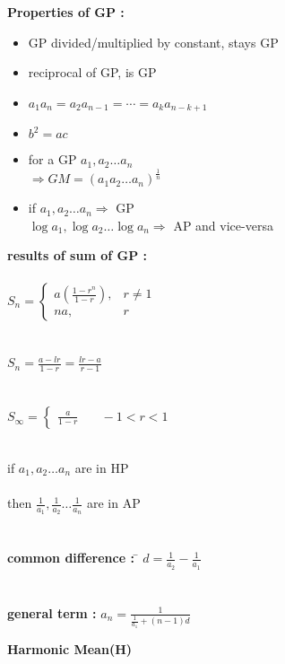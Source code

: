 \documentclass[11pt,a4paper,landscape]{article}
\begin{document}
\begin{multicols}{3}
{\bfseries \noindent Properties of GP :} 
\begin{itemize}
  	\item GP divided/multiplied by constant, stays GP
	\item reciprocal of GP, is GP
	\item $a_1 a_n = a_2 a_{n-1} =\cdots= a_k a_{n-k+1}$
	\item $b^2 = ac$
	\item for a GP $a_1, a_2 \ldots a_n$\\
		$\Rightarrow GM = \left({a_1 a_2 \ldots a_n} \right)^{\frac{1}{n}}$
	\item if  $a_1,a_2 \ldots a_n \Rightarrow$ GP \\
		$\log a_1, \log a_2 \ldots \log a_n \Rightarrow$ AP and vice-versa
\end{itemize}
{\bfseries \noindent results of sum of GP :} \\\\
$
	S_n =
	\begin{cases}
	a\left(\frac{1-r^{n}}{1-r} \right), & r \neq 1\\
	na, & r
	\end{cases}
$\\ \\ \\
$
	S_n = \frac{a -lr}{1-r}=  \displaystyle \frac{lr-a}{r-1}
$\\ \\ \\
$
	S_\infty =
	\begin{cases}
		\frac{a}{1-r} & \quad -1<r<1
	\end{cases}
$\\
\begin{tabbing}
{\bfseries {}}\\
if $a_1,a_2 \ldots a_n$ are in HP\\ \\
then $\frac{1}{a_1},\frac{1}{a_2} \ldots \frac{1}{a_n}$ are in AP\\ \\ \\
{\bfseries \noindent common difference : }\hspace{2mm} \= $d = \frac{1}{a_2}-\frac{1}{a_1}$\\ \\ \\
{\bfseries \noindent general term : }\> $a_n = \frac{1}{\frac{1}{a_1}+(n-1)d}$
\end{tabbing}
{\bfseries \noindent Harmonic Mean(H)}

\end{multicols}
\end{document}
